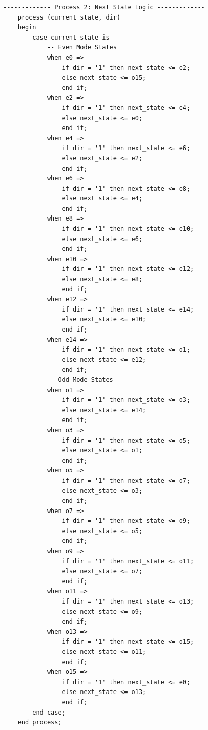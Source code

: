 \documentclass[12pt,a4paper]{article}
\begin{document}
\begin{lstlisting}[style=vhdlstyle]
------------- Process 2: Next State Logic -------------
    process (current_state, dir)
    begin
        case current_state is
            -- Even Mode States
            when e0 =>
                if dir = '1' then next_state <= e2;
                else next_state <= o15;
                end if;
            when e2 =>
                if dir = '1' then next_state <= e4;
                else next_state <= e0;
                end if;
            when e4 =>
                if dir = '1' then next_state <= e6;
                else next_state <= e2;
                end if;
            when e6 =>
                if dir = '1' then next_state <= e8;
                else next_state <= e4;
                end if;
            when e8 =>
                if dir = '1' then next_state <= e10;
                else next_state <= e6;
                end if;
            when e10 =>
                if dir = '1' then next_state <= e12;
                else next_state <= e8;
                end if;
            when e12 =>
                if dir = '1' then next_state <= e14;
                else next_state <= e10;
                end if;
            when e14 =>
                if dir = '1' then next_state <= o1;
                else next_state <= e12;
                end if;
            -- Odd Mode States
            when o1 =>
                if dir = '1' then next_state <= o3;
                else next_state <= e14;
                end if;
            when o3 =>
                if dir = '1' then next_state <= o5;
                else next_state <= o1;
                end if;
            when o5 =>
                if dir = '1' then next_state <= o7;
                else next_state <= o3;
                end if;
            when o7 =>
                if dir = '1' then next_state <= o9;
                else next_state <= o5;
                end if;
            when o9 =>
                if dir = '1' then next_state <= o11;
                else next_state <= o7;
                end if;
            when o11 =>
                if dir = '1' then next_state <= o13;
                else next_state <= o9;
                end if;
            when o13 =>
                if dir = '1' then next_state <= o15;
                else next_state <= o11;
                end if;
            when o15 =>
                if dir = '1' then next_state <= e0;
                else next_state <= o13;
                end if;
        end case;
    end process;


\end{lstlisting}
\end{document}
